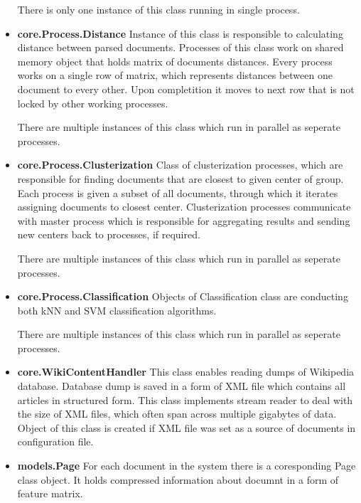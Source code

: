 \begin{itemize}
	There is only one instance of this class running in single process.
	
	\item \textbf{core.Process.Distance}\newline
	Instance of this class is responsible to calculating distance between parsed documents. Processes of this class work on shared memory object that holds matrix of documents distances. Every process works on a single row of matrix, which represents distances between one document to every other. Upon completition it moves to next row that is not locked by other working processes.
	
	There are multiple instances of this class which run in parallel as seperate processes.
	
	\item \textbf{core.Process.Clusterization}\newline
	Class of clusterization processes, which are responsible for finding documents that are closest to given center of group. Each process is given a subset of all documents, through which it iterates assigning documents to closest center. Clusterization processes communicate with master process which is responsible for aggregating results and sending new centers back to processes, if required.
	
	There are multiple instances of this class which run in parallel as seperate processes.
	
	\item \textbf{core.Process.Classification}\newline
	Objects of Classification class are conducting both kNN and SVM classification algorithms.
	
	There are multiple instances of this class which run in parallel as seperate processes.
	
	\item \textbf{core.WikiContentHandler}\newline
	This class enables reading dumps of Wikipedia database. Database dump is saved in a form of XML file which contains all articles in structured form. This class implements stream reader to deal with the size of XML files, which often span across multiple gigabytes of data. Object of this class is created if XML file was set as a source of documents in configuration file.
	
	\item \textbf{models.Page}\newline
	For each document in the system there is a coresponding Page class object. It holds compressed information about documnt in a form of feature matrix.
	

\end{itemize}
